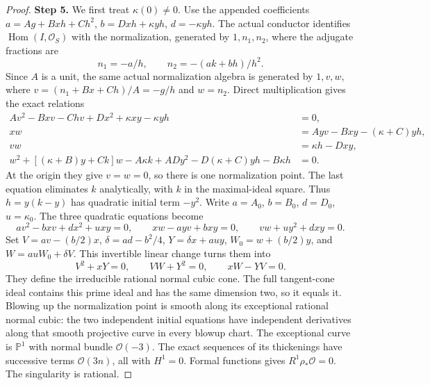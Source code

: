 \begin{proof}
\noindent\textbf{Step 5.} We first treat $\kappa(0)\ne0$.
Use the appended coefficients
$a=Ag+Bxh+Ch^2$, $b=Dxh+\kappa yh$,
$d=-\kappa yh$. The actual conductor identifies
$\operatorname{Hom}(I,\mathcal O_S)$ with the
normalization, generated by $1,n_1,n_2$, where the
adjugate fractions are
\[
          n_1=-a/h,\qquad n_2=-(ak+bh)/h^2.
\]
Since $A$ is a unit, the same actual normalization
algebra is generated by $1,v,w$, where
$v=(n_1+Bx+Ch)/A=-g/h$ and $w=n_2$.
Direct multiplication gives the exact relations
\begin{align*}
 Av^2-Bxv-Chv+Dx^2+\kappa xy-\kappa yh&=0,\\
 xw&=Ayv-Bxy-(\kappa+C)yh,\\
 vw&=\kappa h-Dxy,\\
 w^2+[(\kappa+B)y+Ck]w-A\kappa k+ADy^2
             -D(\kappa+C)yh-B\kappa h&=0.
\end{align*}
At the origin they give $v=w=0$, so there is one
normalization point. The last equation eliminates $k$
analytically, with $k$ in the maximal-ideal square.
Thus $h=y(k-y)$ has quadratic initial term $-y^2$.
Write $a=A_0$, $b=B_0$, $d=D_0$, $u=\kappa_0$.
The three quadratic equations become
\[
 av^2-bxv+dx^2+uxy=0,\qquad
 xw-ayv+bxy=0,\qquad vw+uy^2+dxy=0.
\]
Set $V=av-(b/2)x$, $\delta=ad-b^2/4$,
$Y=\delta x+auy$, $W_0=w+(b/2)y$, and
$W=auW_0+\delta V$. This invertible linear change
turns them into
\[
                       V^2+xY=0,\qquad
                       VW+Y^2=0,\qquad xW-YV=0.
\]
They define the irreducible rational normal cubic cone.
The full tangent-cone ideal contains this prime ideal
and has the same dimension two, so it equals it.
Blowing up the normalization point is smooth along its
exceptional rational normal cubic: the two independent
initial equations have independent derivatives along
that smooth projective curve in every blowup chart.
The exceptional curve is $\mathbb P^1$ with normal
bundle $\mathcal O(-3)$. The exact sequences of its
thickenings have successive terms $\mathcal O(3n)$,
all with $H^1=0$. Formal functions gives
$R^1\rho_*\mathcal O=0$. The singularity is rational.


\end{proof}
